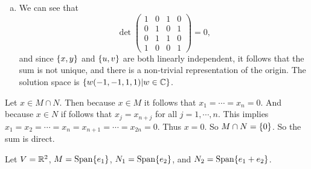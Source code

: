 \begin{problem}
\begin{solution}
\begin{enumerate}[(a)]
			\item We can see that 
			\[ 
			\det \begin{pmatrix}
				1 & 0 & 1 & 0 \\
				0 & 1 & 0 & 1 \\
				0 & 1 & 1 & 0 \\
				1 & 0 & 0 & 1
			\end{pmatrix} = 0,
			 \]
			 and since $ \{x,y\} $ and $ \{u,v\} $ are both linearly independent, it follows that the sum is not unique, and there is a non-trivial representation of the origin. The solution space is $ \{w(-1,-1,1,1)| w\in \mathbb{C}\} $.
		\end{enumerate}
		
	\end{solution}
\end{problem}

\begin{problem}
	\begin{solution}
		Let $ x\in M\cap N $. Then because $ x \in M $ it follows that $ x_1=\cdots=x_n = 0 $. And because $ x\in N $ if follows that $ x_j=x_{n+j} $ for all $ j=1,\cdots,n $. This implies $ x_1=x_2=\cdots=x_n=x_{n+1}=\cdots=x_{2n} = 0 $. Thus $ x=0 $. So $ M\cap N = \{0\} $. So the sum is direct.
	\end{solution}
\end{problem}

\begin{problem}
	\begin{solution}
		Let $ V = \mathbb{R}^2 $, $ M = \operatorname{Span}\{e_1\} $, $ N_1=\operatorname{Span}\{e_2\} $, and $ N_2 = \operatorname{Span}\{e_1+e_2\} $. 
	\end{solution}
\end{problem}

